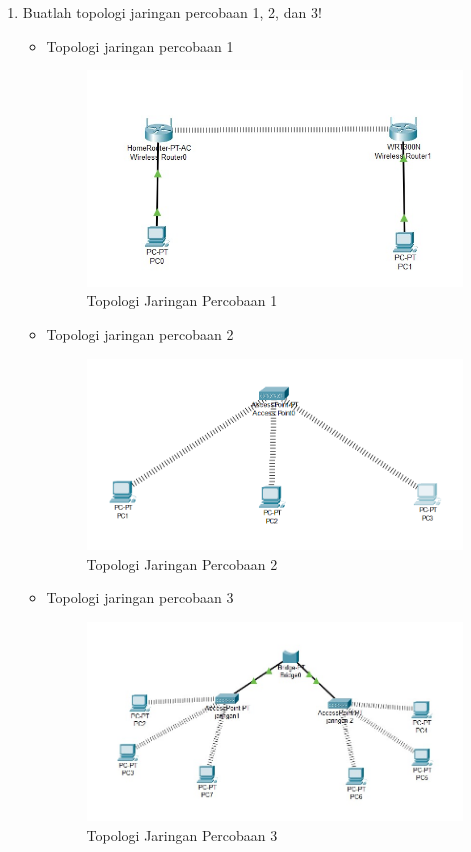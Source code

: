 \begin{enumerate}
	\item Buatlah topologi jaringan percobaan 1, 2, dan 3!
	\begin{itemize}
		\item Topologi jaringan percobaan 1
		\begin{figure}[H]
		\centering
		\includegraphics[width=0.7\linewidth]{P1/img/topologi1.jpg}
		\caption{Topologi Jaringan Percobaan 1}
		\label{fig:gambar31}
	\end{figure}


	\end{itemize}
	\begin{itemize}
		\item Topologi jaringan percobaan 2
		\begin{figure}[H]
			\centering
			\includegraphics[width=0.7\linewidth]{P1/img/topologi2.png}
			\caption{Topologi Jaringan Percobaan 2}
			\label{fig:gambar32}
		\end{figure}
	\end{itemize}
	\begin{itemize}
		\item Topologi jaringan percobaan 3
		\begin{figure}[H]
			\centering
			\includegraphics[width=0.7\linewidth]{P1/img/topologi3.jpg}
			\caption{Topologi Jaringan Percobaan 3}
			\label{fig:gambar33}
		\end{figure}
	\end{itemize}


\end{enumerate}
